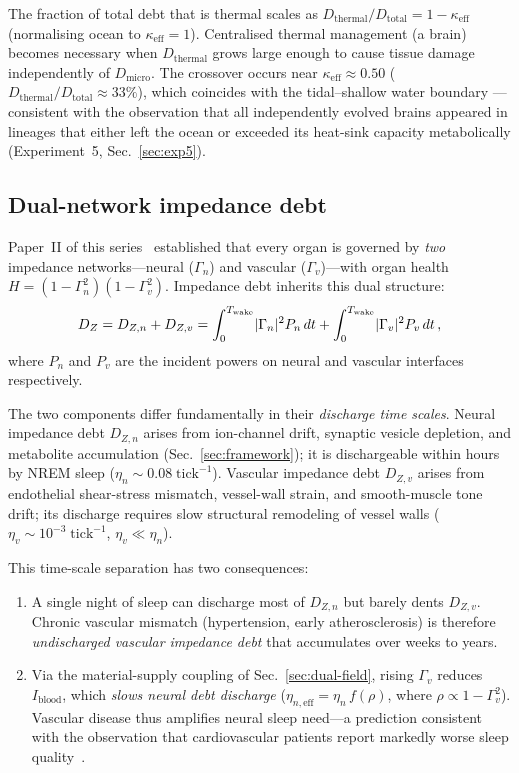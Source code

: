 ﻿\documentclass[aps,pre,twocolumn,superscriptaddress,floatfix]{revtex4-2}
\begin{document}
The fraction of total debt that is thermal scales as
$D_{\mathrm{thermal}}/D_{\mathrm{total}} = 1 - \kappa_{\mathrm{eff}}$
(normalising ocean to $\kappa_{\mathrm{eff}} = 1$).
Centralised thermal management (a brain) becomes necessary
when $D_{\mathrm{thermal}}$ grows large enough to cause
tissue damage independently of $D_{\mathrm{micro}}$.
The crossover occurs near
$\kappa_{\mathrm{eff}} \approx 0.50$
($D_{\mathrm{thermal}}/D_{\mathrm{total}} \approx 33\%$),
which coincides with the tidal--shallow water boundary
---consistent with the observation that all independently
evolved brains appeared in lineages that either left the
ocean or exceeded its heat-sink capacity metabolically
(Experiment~5, Sec.~\ref{sec:exp5}).


\subsection{Dual-network impedance debt}
\label{sec:dual-network-debt}

Paper~II of this series~\cite{PaperII} established that every
organ is governed by \emph{two} impedance networks---neural
($\Gamma_n$) and vascular ($\Gamma_v$)---with organ health
$H = (1-\Gamma_n^2)(1-\Gamma_v^2)$.
Impedance debt inherits this dual structure:
\begin{equation}
  D_Z = D_{Z,n} + D_{Z,v}
      = \int_0^{T_{\rm wake}}\!|\Gamma_n|^2 P_n\,dt
      + \int_0^{T_{\rm wake}}\!|\Gamma_v|^2 P_v\,dt\,,
  \label{eq:DZ-dual}
\end{equation}
where $P_n$ and $P_v$ are the incident powers on neural and
vascular interfaces respectively.

The two components differ fundamentally in their
\emph{discharge time scales}.
Neural impedance debt $D_{Z,n}$ arises from ion-channel drift,
synaptic vesicle depletion, and metabolite accumulation
(Sec.~\ref{sec:framework}); it is dischargeable within hours
by NREM sleep ($\eta_n \sim 0.08\;\mathrm{tick}^{-1}$).
Vascular impedance debt $D_{Z,v}$ arises from endothelial
shear-stress mismatch, vessel-wall strain, and smooth-muscle
tone drift; its discharge requires slow structural remodeling
of vessel walls ($\eta_v \sim 10^{-3}\;\mathrm{tick}^{-1}$,
$\eta_v \ll \eta_n$).

This time-scale separation has two consequences:
\begin{enumerate}
  \item A single night of sleep can discharge most of $D_{Z,n}$
    but barely dents $D_{Z,v}$.
    Chronic vascular mismatch (hypertension, early atherosclerosis)
    is therefore \emph{undischarged vascular impedance debt}
    that accumulates over weeks to years.
  \item Via the material-supply coupling of Sec.~\ref{sec:dual-field},
    rising $\Gamma_v$ reduces $I_{\mathrm{blood}}$, which
    \emph{slows neural debt discharge}
    ($\eta_{n,\mathrm{eff}} = \eta_n\,f(\rho)$,
    where $\rho \propto 1-\Gamma_v^2$).
    Vascular disease thus amplifies neural sleep need---a
    prediction consistent with the observation that
    cardiovascular patients report markedly worse sleep
    quality~\cite{PaperII}.
\end{enumerate}
\end{document}

